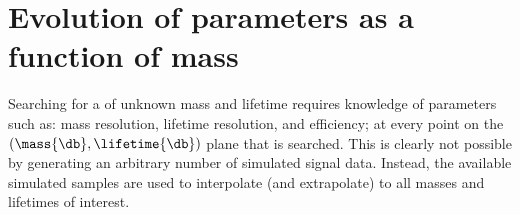 \section{Evolution of parameters as a function of mass}
\label{sec:param}

Searching for a \db of unknown mass and lifetime requires knowledge of parameters such as: mass
resolution, lifetime resolution, and efficiency; at every point on the
$(\mass{\db}, \lifetime{\db})$ plane that is searched.
This is clearly not possible by generating an arbitrary number of simulated signal data.
Instead, the available simulated samples are used to interpolate (and extrapolate) to all masses
and lifetimes of interest.





